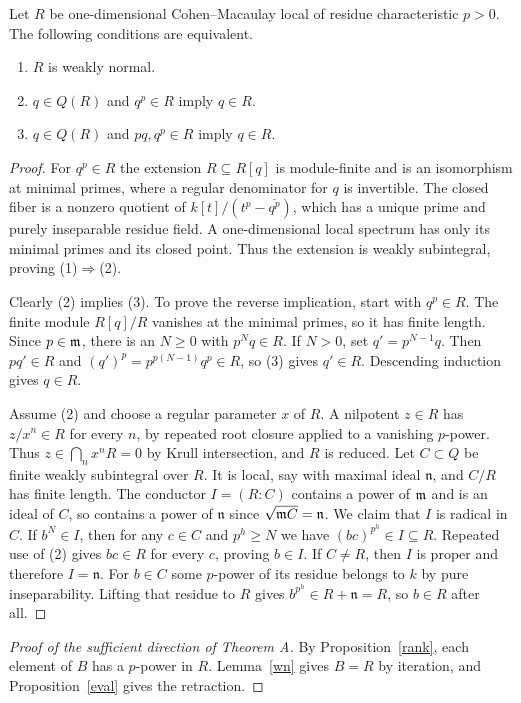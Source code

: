 \begin{lemma}\label{wn}
Let $R$ be one-dimensional Cohen--Macaulay local of residue characteristic $p>0$. The following conditions are equivalent.
\begin{enumerate}
\item $R$ is weakly normal.
\item $q\in Q(R)$ and $q^p\in R$ imply $q\in R$.
\item $q\in Q(R)$ and $pq,q^p\in R$ imply $q\in R$.
\end{enumerate}
\end{lemma}
\begin{proof}
For $q^p\in R$ the extension $R\subseteq R[q]$ is module-finite and is an isomorphism at minimal primes, where a regular denominator for $q$ is invertible. The closed fiber is a nonzero quotient of $k[t]/(t^p-\overline{q^p})$, which has a unique prime and purely inseparable residue field. A one-dimensional local spectrum has only its minimal primes and its closed point. Thus the extension is weakly subintegral, proving (1)$\Rightarrow$(2).

Clearly (2) implies (3).  To prove the reverse implication, start with
$q^p\in R$.  The finite module $R[q]/R$ vanishes at the minimal
primes, so it has finite length.  Since $p\in\mathfrak m$, there is an
$N\ge0$ with $p^Nq\in R$.  If $N>0$, set $q'=p^{N-1}q$.
Then $pq'\in R$ and $(q')^p=p^{p(N-1)}q^p\in R$, so (3)
gives $q'\in R$.  Descending induction gives $q\in R$.

Assume (2) and choose a regular parameter $x$ of $R$. A nilpotent $z\in R$ has $z/x^n\in R$ for every $n$, by repeated root closure applied to a vanishing $p$-power. Thus $z\in\bigcap_n x^nR=0$ by Krull intersection, and $R$ is reduced.
Let $C\subset Q$ be finite weakly subintegral over $R$. It is local, say with maximal ideal $\mathfrak n$, and $C/R$ has finite length. The conductor $I=(R:C)$ contains a power of $\mathfrak m$ and is an ideal of $C$, so contains a power of $\mathfrak n$ since $\sqrt{\mathfrak m C}=\mathfrak n$. We claim that $I$ is radical in $C$. If $b^N\in I$, then for any $c\in C$ and $p^h\ge N$ we have $(bc)^{p^h}\in I\subseteq R$. Repeated use of (2) gives $bc\in R$ for every $c$, proving $b\in I$. If $C\ne R$, then $I$ is proper and therefore $I=\mathfrak n$. For $b\in C$ some $p$-power of its residue belongs to $k$ by pure inseparability. Lifting that residue to $R$ gives $b^{p^h}\in R+\mathfrak n=R$, so $b\in R$ after all.
\end{proof}
\begin{proof}[Proof of the sufficient direction of Theorem A]
By Proposition~\ref{rank}, each element of $B$ has a $p$-power in $R$. Lemma~\ref{wn} gives $B=R$ by iteration, and Proposition~\ref{eval} gives the retraction.
\end{proof}

